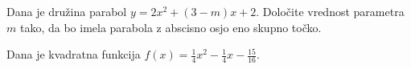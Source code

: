 \documentclass[addpoints]{exam}
\begin{document}
\begin{questions}


    

    \question[4]
    Dana je družina parabol $y=2x^2+(3-m)x+2$.
    Določite vrednost parametra $m$ tako, da bo imela parabola z abscisno osjo eno skupno točko.
        

            \begin{solution}[6cm]

            \end{solution}




\newpage

    \question
    Dana je kvadratna funkcija $f(x)=\frac{1}{4}x^2-\frac{1}{4}x-\frac{15}{16}$.

    \begin{parts}
        


\end{parts}
\end{questions}
\end{document}
